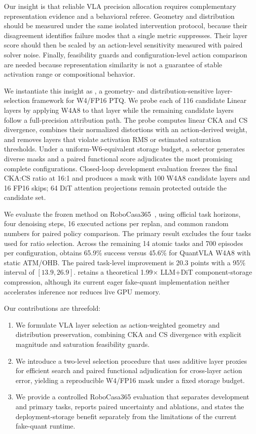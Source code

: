 Our insight is that reliable VLA precision allocation requires complementary representation evidence and a behavioral referee. Geometry and distribution should be measured under the same isolated intervention protocol, because their disagreement identifies failure modes that a single metric suppresses. Their layer score should then be scaled by an action-level sensitivity measured with paired solver noise. Finally, feasibility guards and configuration-level action comparison are needed because representation similarity is not a guarantee of stable activation range or compositional behavior.

We instantiate this insight as \method, a geometry- and distribution-sensitive layer-selection framework for W4/FP16 PTQ. We probe each of 116 candidate Linear layers by applying W4A8 to that layer while the remaining candidate layers follow a full-precision attribution path. The probe computes linear CKA and CS divergence, combines their normalized distortions with an action-derived weight, and removes layers that violate activation RMS or estimated saturation thresholds. Under a uniform-W6-equivalent storage budget, a selector generates diverse masks and a paired functional score adjudicates the most promising complete configurations. Closed-loop development evaluation freezes the final CKA:CS ratio at 16:1 and produces a mask with 100 W4A8 candidate layers and 16 FP16 skips; 64 DiT attention projections remain protected outside the candidate set.

We evaluate the frozen method on RoboCasa365~\cite{nasiriany2026robocasa365}, using official task horizons, four denoising steps, 16 executed actions per replan, and common random numbers for paired policy comparison. The primary result excludes the four tasks used for ratio selection. Across the remaining 14 atomic tasks and 700 episodes per configuration, \method obtains 65.9\% success versus 45.6\% for QuantVLA W4A8 with static ATM/OHB. The paired task-level improvement is 20.3 points with a 95\% interval of $[13.9,26.9]$. \method retains a theoretical 1.99$\times$ LLM+DiT component-storage compression, although its current eager fake-quant implementation neither accelerates inference nor reduces live GPU memory.

Our contributions are threefold:
\begin{enumerate}[(1)]
    \item We formulate VLA layer selection as action-weighted geometry and distribution preservation, combining CKA and CS divergence with explicit magnitude and saturation feasibility guards.
    \item We introduce a two-level selection procedure that uses additive layer proxies for efficient search and paired functional adjudication for cross-layer action error, yielding a reproducible W4/FP16 mask under a fixed storage budget.
    \item We provide a controlled RoboCasa365 evaluation that separates development and primary tasks, reports paired uncertainty and ablations, and states the deployment-storage benefit separately from the limitations of the current fake-quant runtime.
\end{enumerate}
